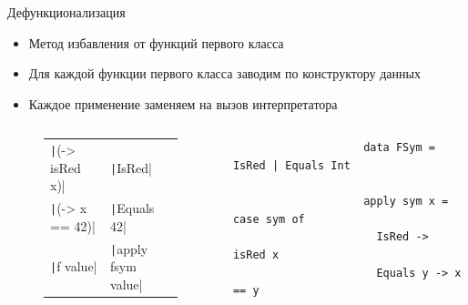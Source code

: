     \begin{frame}[fragile]{Дефункционализация}
        \begin{itemize}
            \item Метод избавления от функций первого класса
            \item Для каждой функции первого класса заводим по конструктору данных
            \item Каждое применение заменяем на вызов интерпретатора
        \end{itemize}
        \begin{columns}[onlytextwidth]
            \begin{column}{0.485\textwidth}
                \begin{figure}[h]
                    \centering
                    \begin{tabular}{ll}
                        \texttt|(\x -> isRed x)| & \texttt|IsRed| \\
                        \texttt|(\x -> x == 42)| & \texttt|Equals 42| \\
                        \texttt|f value| & \texttt|apply fsym value|
                    \end{tabular}
                \end{figure}
            \end{column}\hfill%
            \begin{column}{0.485\textwidth}
                \begin{verbatim}
                    data FSym = IsRed | Equals Int

                    apply sym x = case sym of
                      IsRed -> isRed x
                      Equals y -> x == y
                \end{verbatim}
            \end{column}
        \end{columns}
    \end{frame}

